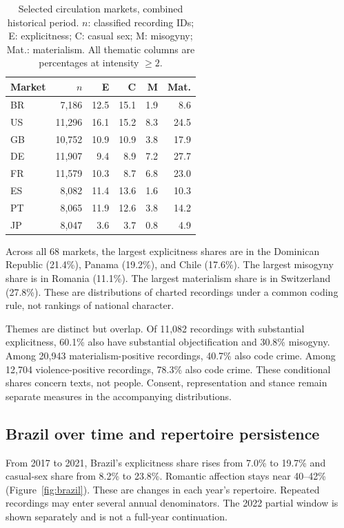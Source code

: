 \documentclass[10pt,a4paper,twocolumn]{article}
\begin{document}
\begin{table}[t]
\caption{Selected circulation markets, combined historical period. $n$: classified recording IDs; E: explicitness; C: casual sex; M: misogyny; Mat.: materialism. All thematic columns are percentages at intensity $\geq2$.}
\label{tab:markets}
\centering\footnotesize\setlength{\tabcolsep}{3.5pt}
\begin{tabular}{@{}lrrrrr@{}}
\toprule Market & $n$ & E & C & M & Mat.\\
\midrule
BR & 7,186 & 12.5 & 15.1 & 1.9 & 8.6 \\
US & 11,296 & 16.1 & 15.2 & 8.3 & 24.5 \\
GB & 10,752 & 10.9 & 10.9 & 3.8 & 17.9 \\
DE & 11,907 & 9.4 & 8.9 & 7.2 & 27.7 \\
FR & 11,579 & 10.3 & 8.7 & 6.8 & 23.0 \\
ES & 8,082 & 11.4 & 13.6 & 1.6 & 10.3 \\
PT & 8,065 & 11.9 & 12.6 & 3.8 & 14.2 \\
JP & 8,047 & 3.6 & 3.7 & 0.8 & 4.9 \\
\bottomrule
\end{tabular}
\end{table}

Across all 68 markets, the largest explicitness shares are in the Dominican Republic (21.4\%), Panama (19.2\%), and Chile (17.6\%). The largest misogyny share is in Romania (11.1\%). The largest materialism share is in Switzerland (27.8\%). These are distributions of charted recordings under a common coding rule, not rankings of national character.

Themes are distinct but overlap. Of 11,082 recordings with substantial explicitness, 60.1\% also have substantial objectification and 30.8\% misogyny. Among 20,943 materialism-positive recordings, 40.7\% also code crime. Among 12,704 violence-positive recordings, 78.3\% also code crime. These conditional shares concern texts, not people. Consent, representation and stance remain separate measures in the accompanying distributions.

\subsection{Brazil over time and repertoire persistence}
From 2017 to 2021, Brazil's explicitness share rises from 7.0\% to 19.7\% and casual-sex share from 8.2\% to 23.8\%. Romantic affection stays near 40--42\% (Figure~\ref{fig:brazil}). These are changes in each year's repertoire. Repeated recordings may enter several annual denominators. The 2022 partial window is shown separately and is not a full-year continuation.
\end{document}
